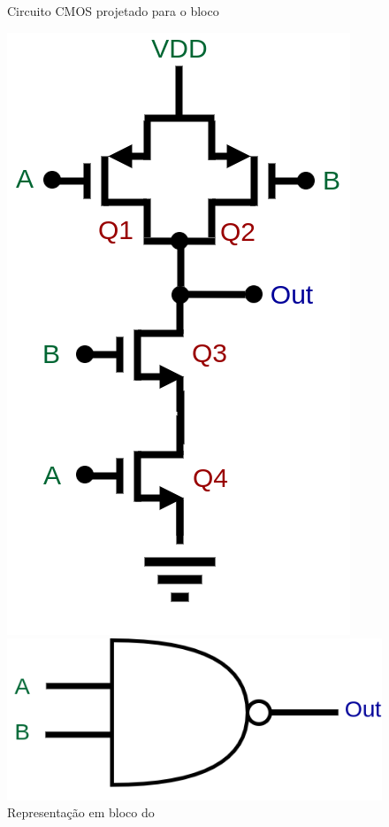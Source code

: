 \begin{figure}[htbp]
 \centering
  \begin{minipage}{0.4\textwidth}
    \centering
    \caption{\label{\NomePFig}Circuito CMOS projetado para o bloco \NomeBloco}
    \includegraphics[scale=0.3]{Circuitos/NAND.png}
  \end{minipage}
  \hfill
  \begin{minipage}{0.4\textwidth}
    \centering
    \caption{\label{\NomeSFig}Representação em bloco do \NomeBlocoNoIt} 
    \includegraphics[scale=0.3]{Circuitos/NAND_block.png}
  \end{minipage}
\end{figure}